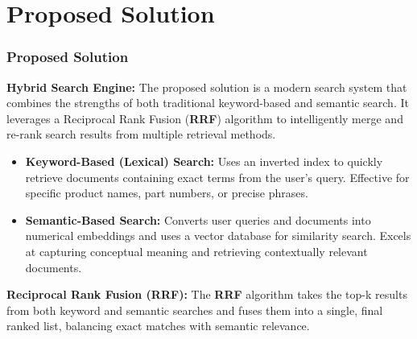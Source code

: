 \section{Proposed Solution}

\begin{frame}
\frametitle{Proposed Solution}

\textbf{Hybrid Search Engine:} \small The proposed solution is a modern search system that combines the strengths of both traditional keyword-based and semantic search. It leverages a Reciprocal Rank Fusion (\textbf{RRF}) algorithm to intelligently merge and re-rank search results from multiple retrieval methods.


\begin{itemize}
    \item \textbf{Keyword-Based (Lexical) Search:} \small Uses an inverted index to quickly retrieve documents containing exact terms from the user's query. Effective for specific product names, part numbers, or precise phrases.
    
    \item \textbf{Semantic-Based Search:} \small Converts user queries and documents into numerical embeddings and uses a vector database for similarity search. Excels at capturing conceptual meaning and retrieving contextually relevant documents.
\end{itemize}

\vspace{0.2cm}

\textbf{Reciprocal Rank Fusion (\textbf{RRF}):} \small The \textbf{RRF} algorithm takes the top-k results from both keyword and semantic searches and fuses them into a single, final ranked list, balancing exact matches with semantic relevance.  

\end{frame}
